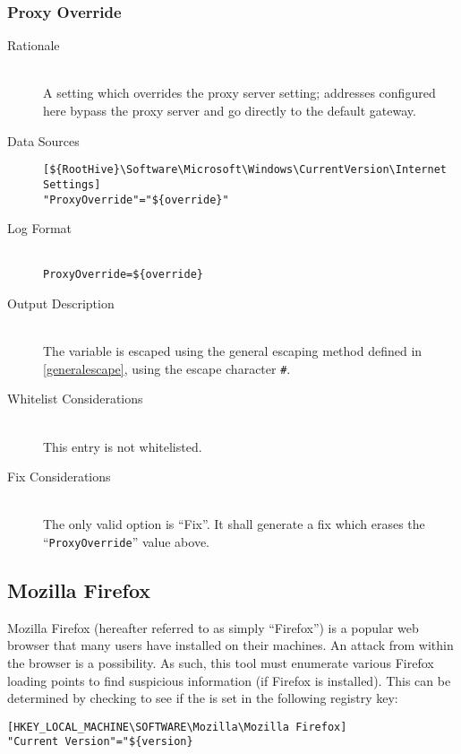 \subsubsection{Proxy Override}
\begin{description}
\item[Rationale] \hfill \\
A setting which overrides the proxy server setting; addresses configured here
bypass the proxy server and go directly to the default gateway.
\item[Data Sources] \hfill
\vspace{-\baselineskip}
\begin{verbatim}
[${RootHive}\Software\Microsoft\Windows\CurrentVersion\Internet Settings]
"ProxyOverride"="${override}"
\end{verbatim}
\item[Log Format] \hfill \\
\verb|ProxyOverride=${override}|
\item[Output Description] \hfill \\
The variable  is escaped using the general escaping method defined
in \ref{generalescape}, using the escape character \verb|#|.
\item[Whitelist Considerations] \hfill \\
This entry is not whitelisted.
\item[Fix Considerations] \hfill \\
The only valid option is ``Fix''. It shall generate a fix which erases the
``\verb|ProxyOverride|'' value above.
\end{description}

\subsection{Mozilla Firefox}
Mozilla Firefox (hereafter referred to as simply ``Firefox'') is a popular web
browser that many users have installed on their machines.  An attack from within
the browser is a possibility.  As such, this tool must enumerate various Firefox
loading points to find suspicious information (if Firefox is installed).  This
can be determined by checking to see if the  is set in the
following registry key:
\begin{verbatim}
[HKEY_LOCAL_MACHINE\SOFTWARE\Mozilla\Mozilla Firefox] 
"Current Version"="${version}
\end{verbatim}

